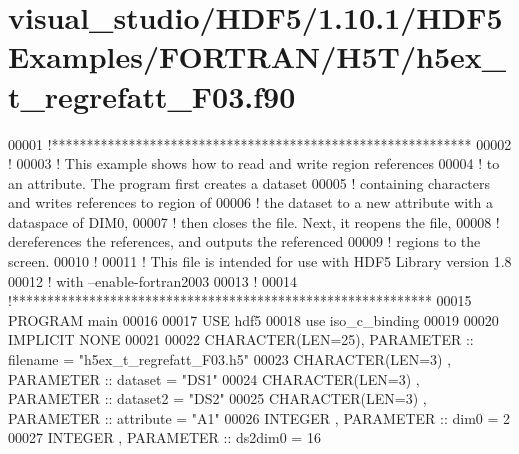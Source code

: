 \hypertarget{visual__studio_2_h_d_f5_21_810_81_2_h_d_f5_examples_2_f_o_r_t_r_a_n_2_h5_t_2h5ex__t__regrefatt___f03_8f90_source}{}\section{visual\+\_\+studio/\+H\+D\+F5/1.10.1/\+H\+D\+F5\+Examples/\+F\+O\+R\+T\+R\+A\+N/\+H5\+T/h5ex\+\_\+t\+\_\+regrefatt\+\_\+\+F03.f90}
\label{visual__studio_2_h_d_f5_21_810_81_2_h_d_f5_examples_2_f_o_r_t_r_a_n_2_h5_t_2h5ex__t__regrefatt___f03_8f90_source}

\begin{DoxyCode}
00001 \textcolor{comment}{!************************************************************}
00002 \textcolor{comment}{!}
00003 \textcolor{comment}{!  This example shows how to read and write region references}
00004 \textcolor{comment}{!  to an attribute.  The program first creates a dataset}
00005 \textcolor{comment}{!  containing characters and writes references to region of}
00006 \textcolor{comment}{!  the dataset to a new attribute with a dataspace of DIM0,}
00007 \textcolor{comment}{!  then closes the file.  Next, it reopens the file,}
00008 \textcolor{comment}{!  dereferences the references, and outputs the referenced}
00009 \textcolor{comment}{!  regions to the screen.}
00010 \textcolor{comment}{!}
00011 \textcolor{comment}{!  This file is intended for use with HDF5 Library version 1.8}
00012 \textcolor{comment}{!  with --enable-fortran2003}
00013 \textcolor{comment}{!}
00014 \textcolor{comment}{!************************************************************}
00015 \textcolor{keyword}{PROGRAM} main
00016 
00017   \textcolor{keywordtype}{USE }hdf5
00018   \textcolor{keywordtype}{use }iso\_c\_binding
00019 
00020   \textcolor{keywordtype}{IMPLICIT NONE}
00021 
00022   \textcolor{keywordtype}{CHARACTER(LEN=25)}, \textcolor{keywordtype}{PARAMETER} :: filename  = \textcolor{stringliteral}{"h5ex\_t\_regrefatt\_F03.h5"}
00023   \textcolor{keywordtype}{CHARACTER(LEN=3)} , \textcolor{keywordtype}{PARAMETER} :: dataset   = \textcolor{stringliteral}{"DS1"}
00024   \textcolor{keywordtype}{CHARACTER(LEN=3)} , \textcolor{keywordtype}{PARAMETER} :: dataset2  = \textcolor{stringliteral}{"DS2"}
00025   \textcolor{keywordtype}{CHARACTER(LEN=3)} , \textcolor{keywordtype}{PARAMETER} :: attribute = \textcolor{stringliteral}{"A1"}
00026   \textcolor{keywordtype}{INTEGER}          , \textcolor{keywordtype}{PARAMETER} :: dim0      = 2
00027   \textcolor{keywordtype}{INTEGER}          , \textcolor{keywordtype}{PARAMETER} :: ds2dim0   = 16

\end{DoxyCode}
